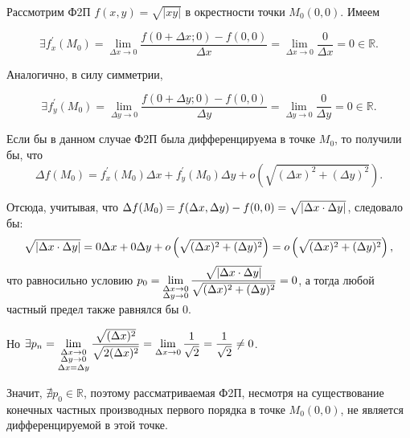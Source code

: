 \begin{example}
	Рассмотрим Ф2П $f(x,y) = \sqrt{|xy|}$ в окрестности точки $M_0(0,0)$. Имеем
    
    \begin{equation*}
        \exists f_x^{'}(M_0) = \lim\limits_{\Delta x \to 0}\dfrac{f(0 + \Delta x; 0) - f(0,0)}{\Delta x} = \lim\limits_{\Delta x \to 0} \dfrac{0}{\Delta x} = 0 \in \mathbb{R}. 
    \end{equation*}
    
    Аналогично, в силу симметрии, 
    
    \begin{equation*}
        \exists f_y^{'}(M_0) = \lim\limits_{\Delta y \to 0}\dfrac{f(0 + \Delta y; 0) - f(0,0)}{\Delta y} = \lim\limits_{\Delta y \to 0} \dfrac{0}{\Delta y} = 0 \in \mathbb{R}.
    \end{equation*}

    Если бы в данном случае Ф2П была дифференцируема в точке $M_0$, то получили бы, что 
    \begin{equation*}
       \Delta f(M_0) = f_x^{'}(M_0)\Delta x + f_y^{'}(M_0)\Delta y + o\left( \sqrt{(\Delta x)^2 + (\Delta y)^2} \right).
    \end{equation*}
    
     Отсюда, учитывая, что $\Delta f(M_0) = f(\Delta x, \Delta y) - f(0,0) = \sqrt{\left\lvert \Delta x \cdot \Delta y \right\rvert}$, следовало бы:           
     \begin{equation*}         
         \sqrt{\left\lvert \Delta x \cdot \Delta y \right\rvert} = 0 \Delta x + 0 \Delta y + 
         o\left( \sqrt{(\Delta x)^2 + (\Delta y)^2} \right) = o\left( \sqrt{(\Delta x)^2 + (\Delta y)^2} \right),
     \end{equation*}
     что равносильно условию $p_0 = \lim\limits_{ \substack{ \Delta x \to 0 \\ \Delta y \to 0 } } \dfrac{\sqrt{|\Delta x \cdot \Delta y|}}{\sqrt{(\Delta x)^2 + (\Delta y)^2}} = 0$, а тогда любой частный предел также равнялся бы $0$. 
    
    Но $\exists p_n = \lim\limits_{ \substack{ \Delta x \to 0 \\ \Delta y \to 0 \\ \Delta x = \Delta y } } \dfrac{\sqrt{(\Delta x) ^ 2}}{\sqrt{2 (\Delta x)^2}} = \lim\limits_{\Delta x \to 0} \dfrac{1}{\sqrt{2}} = \dfrac{1}{\sqrt{2}} \ne 0$.
    
    Значит, $\nexists p_0 \in \mathbb{R}$, поэтому рассматриваемая Ф2П, несмотря на существование конечных частных производных первого порядка в точке $M_0(0,0)$, не является дифференцируемой в этой точке. 
\end{example}

